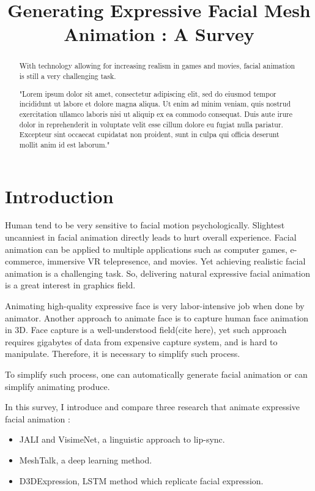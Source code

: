 \documentclass[10pt,twocolumn,letterpaper]{article}
\begin{document}
\title{Generating Expressive Facial Mesh Animation : A Survey}

\author{
{\tt\small}
}
\maketitle

\begin{abstract}
With technology allowing for increasing realism in games and movies, facial animation is still a very challenging task. 

"Lorem ipsum dolor sit amet, consectetur adipiscing elit, sed do eiusmod tempor incididunt ut labore et dolore magna aliqua. Ut enim ad minim veniam, quis nostrud exercitation ullamco laboris nisi ut aliquip ex ea commodo consequat. Duis aute irure dolor in reprehenderit in voluptate velit esse cillum dolore eu fugiat nulla pariatur. Excepteur sint occaecat cupidatat non proident, sunt in culpa qui officia deserunt mollit anim id est laborum."
\end{abstract}

\section{Introduction}
\label{sec:intro}

Human tend to be very sensitive to facial motion psychologically. Slightest uncanniest in facial animation directly leads to hurt overall experience\cite{hansonUpendingUncannyValley}. Facial animation can be applied to multiple applications such as computer games, e-commerce, immersive VR telepresence, and movies. Yet achieving realistic facial animation is a challenging task. So, delivering natural expressive facial animation is a great interest in graphics field.

Animating high-quality expressive face is very labor-intensive job when done by animator. Another approach to animate face is to capture human face animation in 3D. Face capture is a well-understood field(cite here), yet such approach requires gigabytes of data from expensive capture system, and is hard to manipulate. Therefore, it is necessary to simplify such process. 

To simplify such process, one can automatically generate facial animation or can simplify animating produce.

In this survey, I introduce and compare three research that animate expressive facial animation :
\begin{itemize}
 \item JALI\cite{edwardsJALIAnimatorcentricViseme2016} and VisimeNet\cite{zhouVisemenetAudiodrivenAnimatorcentric2018}, a linguistic approach to lip-sync.
 \item MeshTalk\cite{richardMeshTalk3DFace2021}, a deep learning method.
 \item D3DExpression\cite{potamiasLearningGenerateCustomized2020}, LSTM method which replicate facial expression.
\end{itemize}
\end{document}
